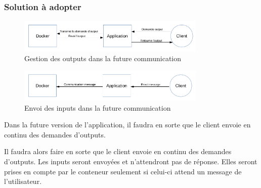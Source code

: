 \subsubsection{Solution à adopter}

\begin{figure}[H]
\centering
\includegraphics[width=0.8\textwidth]{./img/communication/newcomoutput.png}
\caption{Gestion des outputs dans la future communication}
\end{figure}

\begin{figure}[H]
\centering
\includegraphics[width=0.8\textwidth]{./img/communication/envoiinput.png}
\caption{Envoi des inputs dans la future communication}
\end{figure}

\par Dans la future version de l'application, il faudra en sorte que le client envoie en continu des demandes d'outputs.

 Il faudra alors faire en sorte que le client envoie en continu des demandes d'outputs. Les inputs seront envoyées et n'attendront pas de réponse. Elles seront prises en compte par le conteneur seulement si celui-ci attend un message de l'utilisateur.